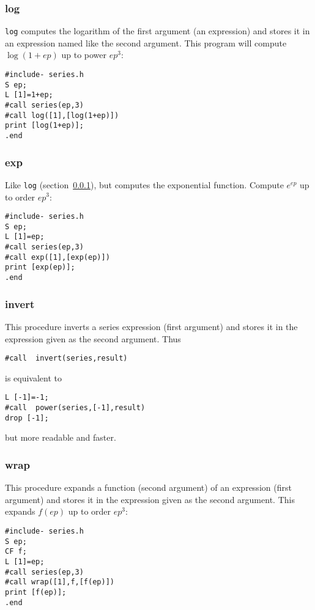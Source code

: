 \documentclass{article}
\begin{document}
\subsubsection{log}
\label{sec:log}

{\tt log} computes the logarithm of the first argument (an
expression) and stores it in an expression named like the second
argument. This program will compute $\log (1+ep)$ up to power $ep^3$:
\begin{verbatim}
#include- series.h
S ep;
L [1]=1+ep;
#call series(ep,3)
#call log([1],[log(1+ep)])
print [log(1+ep)];
.end
\end{verbatim}



\subsubsection{exp}
\label{sec:exp}

Like {\tt log} (section~\ref{sec:log}), but computes the
exponential function. Compute $e^{ep}$ up to order $ep^3$:
\begin{verbatim}
#include- series.h
S ep;
L [1]=ep;
#call series(ep,3)
#call exp([1],[exp(ep)])
print [exp(ep)];
.end
\end{verbatim}


\subsubsection{invert}
\label{sec:invert}

This procedure inverts a series expression (first argument) and stores
it in the expression given as the second argument. Thus
\begin{verbatim}
#call  invert(series,result)
\end{verbatim}
is equivalent to 
\begin{verbatim}
L [-1]=-1;
#call  power(series,[-1],result)
drop [-1];
\end{verbatim}
but more readable and faster.

\subsubsection{wrap}
\label{sec:wrap}

This procedure expands a function (second argument) of an expression
(first argument) 
and stores it in the expression given as the second argument. 
This expands $f(ep)$ up to order $ep^3$:
\begin{verbatim}
#include- series.h
S ep;
CF f;
L [1]=ep;
#call series(ep,3)
#call wrap([1],f,[f(ep)])
print [f(ep)];
.end
\end{verbatim}
\end{document}
